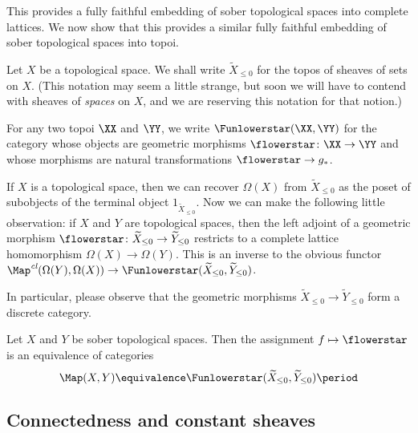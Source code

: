 This provides a fully faithful embedding of sober topological spaces into complete lattices.
We now show that this provides a similar fully faithful embedding of sober topological spaces into topoi.

\begin{ntn}
	Let $ X $ be a topological space.
	We shall write $ \widetilde{X}_{\leq 0} $ for the topos of sheaves of sets on $ X $.
	(This notation may seem a little strange, but soon we will have to contend with sheaves of \emph{spaces} on $ X $, and we are reserving this notation for that notion.)

	For any two topoi $ \XX $ and $ \YY $, we write $ \Funlowerstar( \XX, \YY ) $ for the category whose objects are geometric morphisms $ \flowerstar \colon \XX \to \YY $ and whose morphisms are natural transformations $ \flowerstar \to g_{\ast} $.
\end{ntn}

\begin{nul}
	If $ X $ is a topological space, then we can recover $ \Omega(X) $ from $ \widetilde{X}_{\leq 0} $ as the poset of subobjects of the terminal object $1_{\widetilde{X}_{\leq 0}}$.
	Now we can make the following little observation: if $ X $ and $ Y $ are topological spaces, then the left adjoint of a geometric morphism $ \flowerstar \colon \widetilde{X}_{\leq 0} \to \widetilde{Y}_{\leq 0} $ restricts to a complete lattice homomorphism $ \Omega(X) \to \Omega(Y) $.
	This is an inverse to the obvious functor $ \Map^{\textit{cl}}(\Omega(Y), \Omega(X)) \to \Funlowerstar(\widetilde{X}_{\leq 0}, \widetilde{Y}_{\leq 0})$.

	In particular, please observe that the geometric morphisms $ \widetilde{X}_{\leq 0} \to \widetilde{Y}_{\leq 0} $ form a discrete category.
\end{nul}

\begin{cor}
	Let $ X $ and $ Y $ be sober topological spaces.
	Then the assignment $ f \mapsto \flowerstar $ is an equivalence of categories
	\[
		\Map(X, Y) \equivalence \Funlowerstar(\widetilde{X}_{\leq 0}, \widetilde{Y}_{\leq 0}) \period
	\]
\end{cor}

\subsection{Connectedness and constant sheaves}%
\label{sub:connectedness_and_constant_sheaves}

